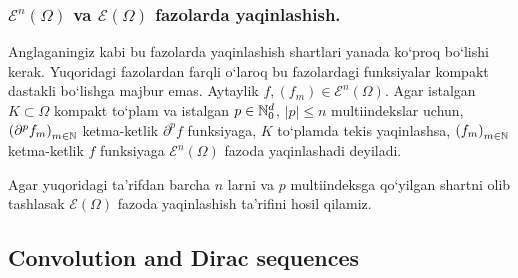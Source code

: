 \subsubsection{$\mathscr{E}^n(\Omega)$ va $\mathscr{E}(\Omega)$ fazolarda yaqinlashish.}
Anglaganingiz kabi bu fazolarda yaqinlashish shartlari yanada ko`proq bo`lishi kerak. Yuqoridagi fazolardan farqli o`laroq bu fazolardagi funksiyalar kompakt dastakli bo`lishga majbur emas. Aytaylik $f, \left(f_m\right)\in \mathscr{E}^n(\Omega)$. Agar istalgan $K\subset \Omega$ kompakt to`plam va istalgan $p\in \mathbb{N}_0^d$, $\lvert p\rvert \le n$ multiindekslar uchun, $\left(\partial ^p f_m\right)_{m\in \mathbb{N}}$ ketma-ketlik $\partial ^p f$ funksiyaga, $K$ to`plamda tekis yaqinlashsa,  $\left(f_m\right)_{m\in \mathbb{N}}$ ketma-ketlik $f$ funksiyaga $\mathscr{E}^n(\Omega)$ fazoda yaqinlashadi deyiladi. 

Agar yuqoridagi ta'rifdan barcha $n$ larni va $p$ multiindeksga qo`yilgan shartni olib tashlasak $\mathscr{E}(\Omega)$ fazoda yaqinlashish ta'rifini hosil qilamiz.

\subsection{Convolution and Dirac sequences}